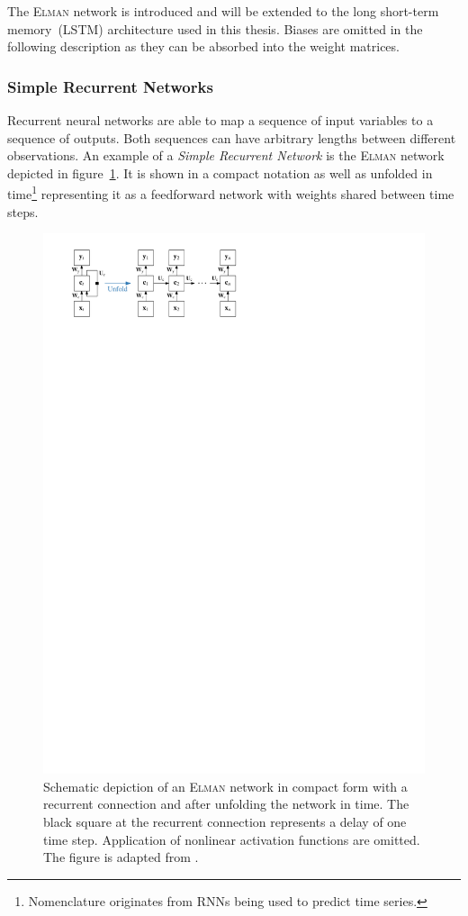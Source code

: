 The \textsc{Elman} network is introduced and will be extended to the long
short-term memory~(LSTM) architecture used in this thesis. Biases are omitted in
the following description as they can be absorbed into the weight matrices.

\subsubsection{Simple Recurrent Networks}
\label{sec:simple_recurrent_networks}
Recurrent neural networks are able to map a sequence of input variables to a
sequence of outputs. Both sequences can have arbitrary lengths between different
observations. An example of a \emph{Simple Recurrent Network} is the
\textsc{Elman} network \cite{elman} depicted in
figure~\ref{fig:schematic_elman_rnn}. It is shown in a compact notation as well
as unfolded in time\footnote{Nomenclature originates from RNNs being used to
  predict time series.} representing it as a feedforward network with weights
shared between time steps.
\begin{figure}[htb]
  \centering
  \includegraphics{./figures/theory/elman_rnn.pdf}
  \caption{Schematic depiction of an \textsc{Elman} network in compact form with
    a recurrent connection and after unfolding the network in time. The black
    square at the recurrent connection represents a delay of one time step.
    Application of nonlinear activation functions are omitted. The figure is
    adapted from \cite{lecun_bengio_hinton_DL}.}
  \label{fig:schematic_elman_rnn}
\end{figure}
